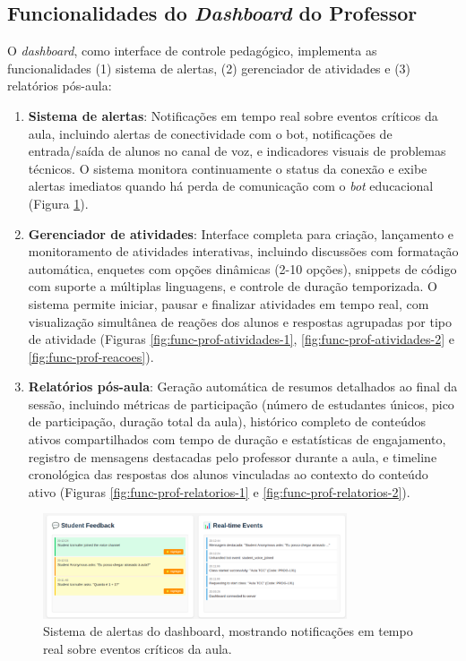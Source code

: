 \subsection{Funcionalidades do \textit{Dashboard} do Professor}
\label{subsec:funcionalidades-dashboard}

O \textit{dashboard}, como interface de controle pedagógico, implementa as
funcionalidades (1) sistema de alertas, (2) gerenciador de atividades e (3)
relatórios pós-aula:

\begin{enumerate}
\item \textbf{Sistema de alertas}: Notificações em tempo real sobre eventos
críticos da aula, incluindo alertas de conectividade com o bot, notificações de
entrada/saída de alunos no canal de voz, e indicadores visuais de problemas
técnicos. O sistema monitora continuamente o status da conexão e exibe alertas
imediatos quando há perda de comunicação com o \textit{bot} educacional
(Figura \ref{fig:func-prof-alertas}).
\item \textbf{Gerenciador de atividades}: Interface completa para criação,
lançamento e monitoramento de atividades interativas, incluindo discussões com
formatação automática, enquetes com opções dinâmicas (2-10 opções), snippets de
código com suporte a múltiplas linguagens, e controle de duração temporizada. O
sistema permite iniciar, pausar e finalizar atividades em tempo real, com
visualização simultânea de reações dos alunos e respostas agrupadas por tipo de
atividade (Figuras \ref{fig:func-prof-atividades-1}, \ref{fig:func-prof-atividades-2} 
e \ref{fig:func-prof-reacoes}).
\item \textbf{Relatórios pós-aula}: Geração automática de resumos detalhados ao
final da sessão, incluindo métricas de participação (número de estudantes
únicos, pico de participação, duração total da aula), histórico completo de
conteúdos ativos compartilhados com tempo de duração e estatísticas de
engajamento, registro de mensagens destacadas pelo professor durante a aula, e
timeline cronológica das respostas dos alunos vinculadas ao contexto do conteúdo
ativo (Figuras \ref{fig:func-prof-relatorios-1} e \ref{fig:func-prof-relatorios-2}).
\end{enumerate}

\begin{figure}[H]
\centering
\includegraphics[width=0.8\textwidth]{func-professores/sistema-alertas.png}
\caption{Sistema de alertas do dashboard, mostrando notificações em tempo real sobre eventos críticos da aula.}
\label{fig:func-prof-alertas}
\end{figure}

